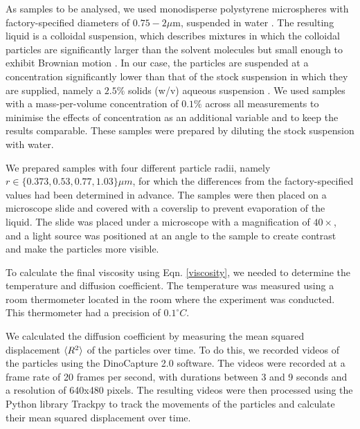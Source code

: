 \documentclass[twocolumn,a4paper,aps,amsmath,amssymb,floatfix,superscriptaddress]{revtex4-2}
\begin{document}
    As samples to be analysed, we used monodisperse polystyrene microspheres with factory-specified diameters of $0.75-2 \mu\text{m}$, suspended in water \cite{PolybeadMicrospheres200um}. The resulting liquid is a colloidal suspension, which describes mixtures in which the colloidal particles are significantly larger than the solvent molecules but small enough to exhibit Brownian motion \cite{dijkstraComputerSimulationsCharge2001}. In our case, the particles are suspended at a concentration significantly lower than that of the stock suspension in which they are supplied, namely a $2.5\%$ solids (w/v) aqueous suspension \cite{PolybeadMicrospheres200um}. We used samples with a mass-per-volume concentration of $0.1\%$ across all measurements to minimise the effects of concentration as an additional variable and to keep the results comparable. These samples were prepared by diluting the stock suspension with water.

    We prepared samples with four different particle radii, namely $r \in \{0.373, 0.53, 0.77, 1.03\} \mu m$, for which the differences from the factory-specified values had been determined in advance. The samples were then placed on a microscope slide and covered with a coverslip to prevent evaporation of the liquid. The slide was placed under a microscope with a magnification of $40\times$, and a light source was positioned at an angle to the sample to create contrast and make the particles more visible.

    To calculate the final viscosity using Eqn. \ref{viscosity}, we needed to determine the temperature and diffusion coefficient. The temperature was measured using a room thermometer located in the room where the experiment was conducted. This thermometer had a precision of $0.1^\circ C$.

    We calculated the diffusion coefficient by measuring the mean squared displacement $\braket{R^2}$ of the particles over time. To do this, we recorded videos of the particles using the DinoCapture 2.0 software. The videos were recorded at a frame rate of 20 frames per second, with durations between 3 and 9 seconds and a resolution of 640x480 pixels. The resulting videos were then processed using the Python library Trackpy to track the movements of the particles and calculate their mean squared displacement over time.
\end{document}
